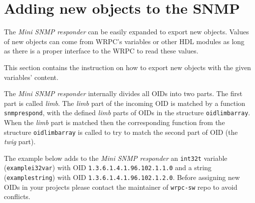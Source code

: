 \documentclass[a4paper, 12pt]{article}
\renewcommand{\_}{\underscore\allowbreak}
\begin{document}
\newpage
\section{Adding new objects to the SNMP}
\label{Adding new objects to the SNMP}

The \textit{Mini SNMP responder} can be easily expanded to export new objects.
Values of new objects can come from WRPC's variables or other HDL modules
as long as there is a proper interface to the WRPC to read these values.

This section contains the instruction on how to export new objects with
the given variables' content.

The \textit{Mini SNMP responder} internally divides all OIDs into two parts.
The first part is called \textit{limb}. The \textit{limb} part of the incoming OID is
matched by a function \texttt{snmp\_respond}, with the defined \textit{limb} parts of OIDs
in the structure \texttt{oid\_limb\_array}.
When the \textit{limb} part is matched then the corresponding function from
the structure \texttt{oid\_limb\_array} is called to try to match the second part of
OID (the \textit{twig} part).

\begin{sloppypar} %
The example below adds to the \textit{Mini SNMP responder} an \texttt{int32\_t} variable
(\texttt{example\_i32var}) with OID \texttt{1.3.6.1.4.1.96.102.1.1.0} and a string
(\texttt{example\_string}) with OID \texttt{1.3.6.1.4.1.96.102.1.2.0}.
Before assigning new OIDs in your projects please contact the maintainer of
\texttt{wrpc-sw} repo to avoid conflicts.
\end{sloppypar}
\end{document}
